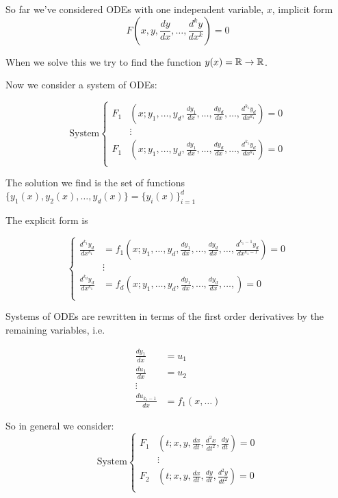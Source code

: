 \documentclass[10pt]{scrartcl}
\begin{document}

So far we've considered ODEs with one independent variable, $x$, implicit form
\[F\left(x,y,\dfrac{dy}{dx},\dots,\dfrac{d^ky}{dx^k}\right) = 0\]


When we solve this we try to find the function $y(x) = \mathbb{R} \to \mathbb{R}$. 

Now we consider a system of ODEs: 

\[
\text{System}
\left\{
\begin{aligned}
F_1&\left(x;y_1,\dots,y_d, \frac{dy_1}{dx},\dots,\frac{dy_d}{dx},\dots,\frac{d^{k_1}y_d}{dx^{k_1}}\right) = 0\\
&\vdots\\
F_1&\left(x;y_1,\dots,y_d, \frac{dy_1}{dx},\dots,\frac{dy_d}{dx},\dots,\frac{d^{k_1}y_d}{dx^{k_1}}\right) = 0\\
\end{aligned}\right.
\]

The solution we find is the set of functions $\{y_1(x),y_2(x),\dots,y_d(x)\} = \{y_i(x)\}_{i=1}^d$

The explicit form is 

\[
\left\{
\begin{aligned}
\frac{d^{k_1}y_d}{dx^{k_1}} &= f_1\left(x;y_1,\dots,y_d, \frac{dy_1}{dx},\dots,\frac{dy_d}{dx},\dots,\frac{d^{k_1-1}y_d}{dx^{k_1-1}}\right) = 0\\
&\vdots\\
\frac{d^{k_d}y_d}{dx^{k_1}} &= f_d\left(x;y_1,\dots,y_d, \frac{dy_1}{dx},\dots,\frac{dy_d}{dx},\dots,\right) = 0\\
\end{aligned}\right.
\]

Systems of ODEs are rewritten in terms of the first order derivatives by the remaining variables, i.e. 

\[
\begin{aligned}
  \frac{dy_1}{dx} &= u_1\\[0.2cm]
  \frac{du_1}{dx} &= u_2\\
  \vdots\\
  \frac{du_{k_1-1}}{dx} &= f_1(x,\dots)
\end{aligned}
\]

So in general we consider: 
\[
\text{System}
\left\{
\begin{aligned}
F_1&\left(t; x,y, \frac{dx}{dt}, \frac{d^2x}{dt^2}, \frac{dy}{dt}\right) = 0\\
&\vdots\\
F_2&\left(t; x, y, \frac{dx}{dt}, \frac{dy}{dt}, \frac{d^2y}{dt^2}\right) = 0\\
\end{aligned}\right.
\]
\end{document}
